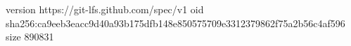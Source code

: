 version https://git-lfs.github.com/spec/v1
oid sha256:ca9eeb3eacc9d40a93b175dfb148e850575709e3312379862f75a2b56c4af596
size 890831
